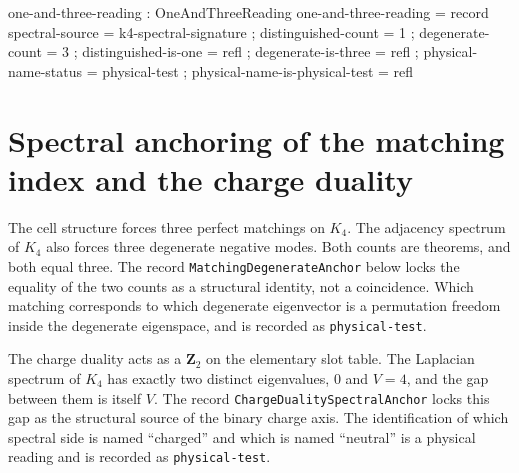 \documentclass[11pt]{article}
\begin{document}
\begin{code}
one-and-three-reading : OneAndThreeReading
one-and-three-reading = record
  { spectral-source                = k4-spectral-signature
  ; distinguished-count            = 1
  ; degenerate-count               = 3
  ; distinguished-is-one           = refl
  ; degenerate-is-three            = refl
  ; physical-name-status           = physical-test
  ; physical-name-is-physical-test = refl
  }
\end{code}

\section{Spectral anchoring of the matching index and the charge duality}

The cell structure forces three perfect matchings on $K_4$.  The
adjacency spectrum of $K_4$ also forces three degenerate negative
modes.  Both counts are theorems, and both equal three.  The record
\texttt{MatchingDegenerateAnchor} below locks the equality of the two
counts as a structural identity, not a coincidence.  Which matching
corresponds to which degenerate eigenvector is a permutation freedom
inside the degenerate eigenspace, and is recorded as
\texttt{physical-test}.

The charge duality acts as a $\mathbf{Z}_2$ on the elementary slot
table.  The Laplacian spectrum of $K_4$ has exactly two distinct
eigenvalues, $0$ and $V=4$, and the gap between them is itself $V$.
The record \texttt{ChargeDualitySpectralAnchor} locks this gap as the
structural source of the binary charge axis.  The identification of
which spectral side is named ``charged'' and which is named ``neutral''
is a physical reading and is recorded as \texttt{physical-test}.
\end{document}
